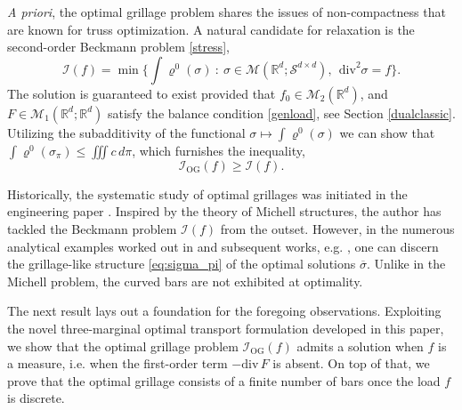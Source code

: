 \documentclass[11pt,letterpaper,reqno]{amsart}
\theoremstyle{definition}
\numberwithin{equation}{section}
\newcommand{\R}{\mathbb{R}}
\newcommand{\Rd}{\R^d}
\newcommand{\ov}{\overline}
\newcommand{\Mes}{{\mathcal{M}}}
\newcommand{\dive}{{\mathrm{div}}}
\newcommand{\I}{\mathcal{I}}
\newcommand{\Sdd}{{\mathcal{S}^{d \times d}}}
\begin{document}
{\textit{A priori}, the optimal grillage problem shares the issues of non-compactness that are known for truss optimization. A natural candidate for relaxation is the second-order Beckmann problem \eqref{stress},
\begin{equation*}
	\I(f) = \min
	\biggl\{ \int \varrho^0(\sigma) \ : \ \sigma \in \Mes(\R^d;\Sdd), \ \ \dive^2 \sigma = f  \biggr\}.
\end{equation*} 
The solution is guaranteed to exist provided that $f_0 \in \Mes_2(\Rd)$, and $F \in \Mes_1(\Rd;\Rd)$ satisfy the balance condition \eqref{genload}, see Section \ref{dualclassic}.
Utilizing the subadditivity of the functional $\sigma \mapsto \int \varrho^0(\sigma)$ we can show that $\int \varrho^0(\sigma_\pi) \leq \iiint c \,d\pi$, which  furnishes the inequality,
\begin{equation}
	\label{eq:grillage>Beckmann}
	\mathcal{I}_{\mathrm{OG}}(f) \geq \I(f).
\end{equation}

Historically, the systematic study of optimal grillages was initiated in the engineering paper \cite{rozvany1972a}. Inspired by the theory of Michell structures, the author has tackled the Beckmann problem $\I(f)$ from the outset. However, in the numerous analytical examples worked out in \cite{rozvany1972a} and subsequent works, e.g. \cite{prager1977}, one can discern the grillage-like structure \eqref{eq:sigma_pi} of the optimal solutions $\ov{\sigma}$. Unlike in the Michell problem, the curved bars are not exhibited at optimality.

The next result lays out a foundation for the foregoing observations. Exploiting the novel three-marginal optimal transport formulation developed in this paper, we  show that the optimal grillage problem $\I_{\mathrm{OG}}(f)$ admits a solution when $f$ is a measure, i.e. when the first-order term $-\dive \, F$ is absent. On top of that, we prove that the optimal grillage consists of a finite number of bars once the load $f$ is discrete.

}
\end{document}
